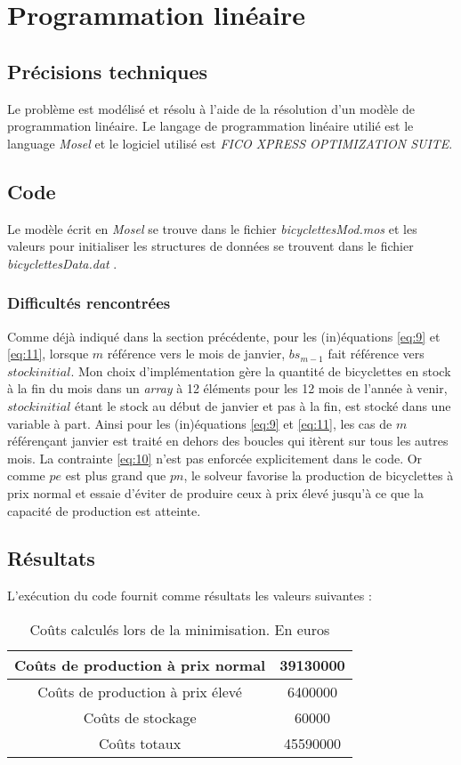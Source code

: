 \documentclass[11pt,a4paper]{report}
\begin{document}
\section*{Programmation linéaire}
\subsection*{Précisions techniques}
Le problème est modélisé et résolu à l'aide de la résolution d'un modèle de programmation linéaire. Le langage de programmation linéaire utilié est le language \textit{Mosel} et le logiciel utilisé est \textit{FICO XPRESS OPTIMIZATION SUITE}.
\subsection*{Code}
Le modèle écrit en \textit{Mosel} se trouve dans le fichier \og \textit{bicyclettesMod.mos}  \fg{} et les valeurs pour initialiser les structures de données se trouvent dans le fichier \og \textit{bicyclettesData.dat} \fg{}.
\subsubsection*{Difficultés rencontrées}
Comme déjà indiqué dans la section précédente, pour les (in)équations \eqref{eq:9} et \eqref{eq:11}, lorsque $m$ référence vers le mois de janvier, $bs_{m-1}$ fait référence vers $stockinitial$. Mon choix d'implémentation gère la quantité de bicyclettes en stock à la fin du mois dans un \textit{array} à 12 éléments pour les 12 mois de l'année à venir, $stockinitial$ étant le stock au début de janvier et pas à la fin, est stocké dans une variable à part. Ainsi pour les (in)équations \eqref{eq:9} et \eqref{eq:11}, les cas de $m$ référençant janvier est traité en dehors des boucles qui itèrent sur tous les autres mois.\newline
La contrainte \eqref{eq:10} n'est pas enforcée explicitement dans le code. Or comme $pe$ est plus grand que $pn$, le solveur favorise la production de bicyclettes à prix normal et essaie d'éviter de produire ceux à prix élevé jusqu'à ce que la capacité de production est atteinte.
\subsection*{Résultats}
L'exécution du code fournit comme résultats les valeurs suivantes :
\begin{table}[h]
\centering
\caption{Coûts calculés lors de la minimisation. En euros}
\begin{tabular}{ |c |c|}
\hline
 Coûts de production à prix normal & 39130000   \\
 \hline
 Coûts de production à prix élevé & 6400000 \\  
 \hline
  Coûts de stockage &   60000 \\
 \hline
   Coûts totaux & 45590000   \\
 \hline
\end{tabular}
\end{table}
\end{document}

